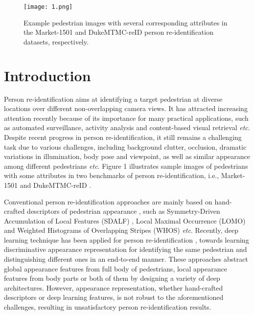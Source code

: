 \documentclass[sigconf]{acmart}
\begin{document}


\maketitle

\begin{figure}[!t]
	\begin{center}
		\texttt{[image: 1.png]}
	\end{center}
	\caption{Example pedestrian images with several corresponding attributes in the Market-1501 and DukeMTMC-reID person re-identification datasets, respectively.}
	\label{fig:long}
	\label{fig:onecol}
\end{figure}\section{Introduction}
Person re-identification aims at identifying a target pedestrian at diverse locations over different non-overlapping camera views. It has attracted increasing attention recently because of its importance for many practical applications, such as automated surveillance, activity analysis and content-based visual retrieval \textit{etc}\cite{40,59}. Despite recent progress in person re-identification, it still remains a challenging task due to various challenges, including background clutter, occlusion, dramatic variations in illumination, body pose and viewpoint, as well as similar appearance among different pedestrians \textit{etc}. Figure 1 illustrates sample images of pedestrians with some attributes in two benchmarks of person re-identification, i.e., Market-1501 \cite{17} and DukeMTMC-reID \cite{18}.

Conventional person re-identification approaches are mainly based on hand-crafted descriptors of pedestrian appearance \cite{41,43}, such as Symmetry-Driven Accumulation of Local Features (SDALF) \cite{1}, Local Maximal Occurrence (LOMO)~\cite{2} and Weighted Histograms of Overlapping Stripes (WHOS) \cite{54}\textit{etc}. Recently, deep learning technique has been applied for person re-identification \cite{46,47,48,50}, towards learning discriminative appearance representation for identifying the same pedestrian and distinguishing different ones in an end-to-end manner. These approaches abstract global appearance features from full body of pedestrians, local appearance features from body parts or both of them by designing a variety of deep architectures. However, appearance representation, whether hand-crafted descriptors or deep learning features, is not robust to the aforementioned challenges, resulting in unsatisfactory person re-identification results.
\end{document}
